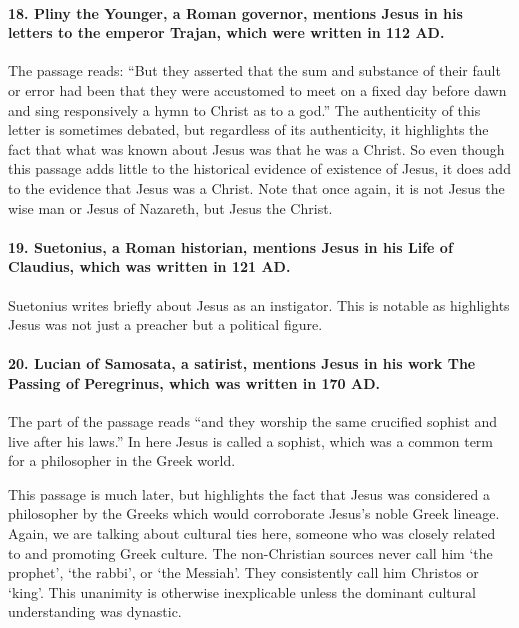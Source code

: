 \paragraph{18.
Pliny the Younger, a Roman governor, mentions Jesus in his letters to the emperor Trajan, which were written in 112 AD.}\label{par:pliny-the-younger-a-roman-governor-mentions-jesus-in-his-letters-to-the-emperor-trajan-which-were-written-in-112-ad.}

The passage reads: ``But they asserted that the sum and substance of their fault or error had been that they were accustomed to meet on a fixed day before dawn and sing responsively a hymn to Christ as to a god.'' The authenticity of this letter is sometimes debated, but regardless of its authenticity, it highlights the fact that what was known about Jesus was that he was a Christ.
So even though this passage adds little to the historical evidence of existence of Jesus, it does add to the evidence that Jesus was a Christ.
Note that once again, it is not Jesus the wise man or Jesus of Nazareth, but Jesus the Christ.

\paragraph{19.
Suetonius, a Roman historian, mentions Jesus in his Life of Claudius, which was written in 121 AD.}\label{par:suetonius-a-roman-historian-mentions-jesus-in-his-life-of-claudius-which-was-written-in-121-ad.}

Suetonius writes briefly about Jesus as an instigator.
This is notable as highlights Jesus was not just a preacher but a political figure.

\paragraph{20.
Lucian of Samosata, a satirist, mentions Jesus in his work The Passing of Peregrinus, which was written in 170 AD.}\label{par:lucian-of-samosata-a-satirist-mentions-jesus-in-his-work-the-passing-of-peregrinus-which-was-written-in-170-ad.}

The part of the passage reads ``and they worship the same crucified sophist and live after his laws.'' In here Jesus is called a sophist, which was a common term for a philosopher in the Greek world.

This passage is much later, but highlights the fact that Jesus was considered a philosopher by the Greeks which would corroborate Jesus's noble Greek lineage.
Again, we are talking about cultural ties here, someone who was closely related to and promoting Greek culture.
The non-Christian sources never call him ‘the prophet’, ‘the rabbi’, or ‘the Messiah’.
They consistently call him Christos or ‘king’.
This unanimity is otherwise inexplicable unless the dominant cultural understanding was dynastic.


